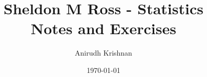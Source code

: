 \documentclass[letterpaper,12pt]{report}
\begin{document}
\author{Anirudh Krishnan}
\title{Sheldon M Ross - Statistics \\ Notes and Exercises}
\date{\today}

\maketitle
\tableofcontents




\end{document}
